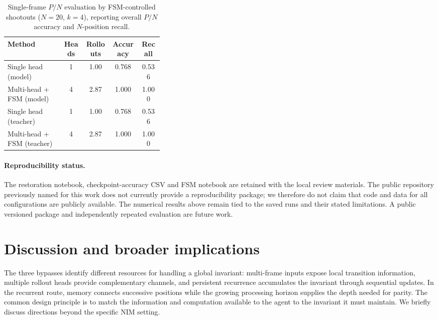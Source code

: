 \documentclass[11pt]{article}
\theoremstyle{plain}
\theoremstyle{definition}
\theoremstyle{remark}
\numberwithin{equation}{section}
\begin{document}
\begin{table}[t]
\centering
\small
\begin{tabular}{p{0.36\linewidth}cccc}
\hline
Method & Heads & Rollouts & Accuracy & Recall \\
\hline
Single head (model) & 1 & 1.00 & 0.768 & 0.536 \\
Multi-head + FSM (model) & 4 & 2.87 & 1.000 & 1.000 \\
Single head (teacher) & 1 & 1.00 & 0.768 & 0.536 \\
Multi-head + FSM (teacher) & 4 & 2.87 & 1.000 & 1.000 \\
\hline
\end{tabular}
\caption{Single-frame $P/N$ evaluation by FSM-controlled shootouts ($N=20$, $k=4$), reporting overall $P/N$ accuracy and $N$-position recall.}
\label{tab:fsm-shootout}
\end{table}



\paragraph{Reproducibility status.}
The restoration notebook, checkpoint-accuracy CSV and FSM notebook are retained with the local review materials. The public repository previously named for this work does not currently provide a reproducibility package; we therefore do not claim that code and data for all configurations are publicly available. The numerical results above remain tied to the saved runs and their stated limitations. A public versioned package and independently repeated evaluation are future work.

\section{Discussion and broader implications}
\label{sec:discussion}

The three bypasses identify different resources for handling a global invariant: multi-frame inputs expose local transition information, multiple rollout heads provide complementary channels, and persistent recurrence accumulates the invariant through sequential updates. In the recurrent route, memory connects successive positions while the growing processing horizon supplies the depth needed for parity. The common design principle is to match the information and computation available to the agent to the invariant it must maintain. We briefly discuss directions beyond the specific NIM setting.
\end{document}
